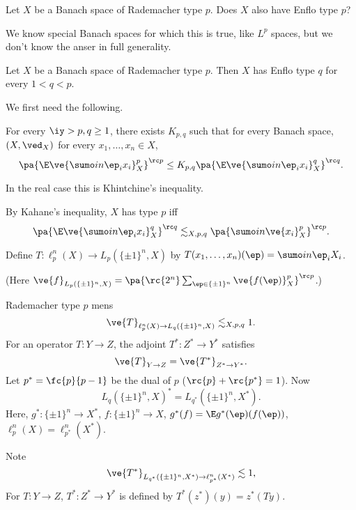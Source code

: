 \begin{qu}
Let $X$ be a Banach space of Rademacher type $p$. Does $X$ also have Enflo type $p$?
\end{qu}
We know special Banach spaces for which this is true, like $L^p$ spaces, but we don't know the anser in full generality.
\begin{thm}[Pisier]
Let $X$ be a Banach space of Rademacher type $p$. %
Then $X$ has Enflo type $q$ for every $1<q<p$.
\end{thm}

We first need the following.
\begin{thm}
For every $\iy>p,q\ge 1$, there exists $K_{p,q}$ such that for every Banach space, $(X,\ved_X)$ for every $x_1,\ldots, x_n\in X$, 
\[
\pa{\E\ve{\sumo in \ep_i x_i}_X^p}^{\rc p}\le K_{p,q}\pa{\E \ve{\sumo in \ep_i x_i}_X^q}^{\rc q}.
\]
\end{thm}
In the real case this is Khintchine's inequality.

By Kahane's inequality, $X$ has type $p$ iff
\[
\pa{\E\ve{\sumo in \ep_i x_i}_X^q}^{\rc q} \lesssim_{X,p,q} \pa{\sumo in \ve{x_i}_X^p}^{\rc p}.
\]

Define $T:\ell_p^n(X)\to L_p(\{\pm 1\}^n,X)$ by $T(x_1,\ldots, x_n)(\ep) = \sumo in \ep_iX_i$.

(Here $\ve{f}_{L_p(\{\pm 1\}^n,X)} = \pa{\rc{2^n} \sum_{\ep\in \{\pm 1\}^n} \ve{f(\ep)}_X^p}^{\rc p}$.)

%

Rademacher type $p$ mens
\[
\ve{T}_{\ell_p^n(X)\to L_q(\{\pm 1\}^n, X)}\lesssim_{X,p,q} 1.
\]
For an operator $T:Y\to Z$, the adjoint $T^*:Z^*\to Y^*$ satisfies 
\[
\ve{T}_{Y\to Z} = \ve{T^*}_{Z^*\to Y^*}. 
\]
Let $p^*=\fc{p}{p-1}$ be the dual of $p$ ($\rc{p}+\rc{p^*}=1$). Now 
\[
L_q(\{\pm 1\}^n, X)^*=L_{q^*} (\{\pm 1\}^n, X^*).
\]
Here, $g^*:\{\pm 1\}^n\to X^*$, $f:\{\pm 1\}^n\to X$, $g^*(f) = \E g^*(\ep) (f(\ep))$, $\ell_p^n(X) = \ell_{p^*}^n(X^*)$. 

Note 
\[\ve{T^*}_{L_{q^*}(\{\pm 1\}^n, X^*)\to \ell_{p^*}^n(X^*)}\lesssim 1,
\]
For $T:Y\to Z$, $T^*:Z^*\to Y^*$ is defined by $T^*(z^*)(y) = z^*(Ty)$. 

